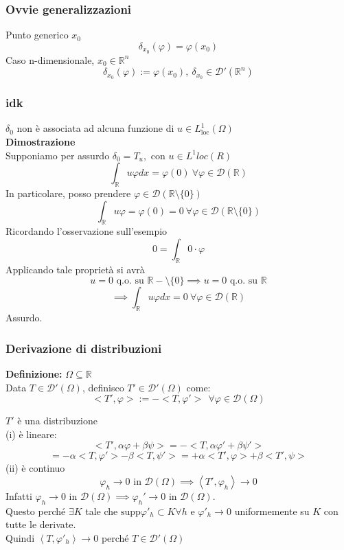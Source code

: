 \documentclass[a4paper]{article}
\newcommand{\R}{\mathbb{R}}
\begin{document}
\subsubsection{Ovvie generalizzazioni}
Punto generico $x_0$
\[\delta_{x_0}(\varphi)=\varphi(x_0)\]
Caso n-dimensionale, $x_0\in \R^n$
\[\delta_{x_0}(\varphi):=\varphi(x_0),\ \delta_{x_0}\in \mathcal D'(\R^n)\]
\subsubsection{idk}
$\delta_0$ non è associata ad alcuna funzione di $u\in L^1_{\text{loc}}(\Omega)$
\\\textbf{Dimostrazione} 
\\Supponiamo per assurdo $\delta_0=T_u,$ con $u\in L^1loc(R)$
\[\int_{\R}^{} u\varphi dx=\varphi(0)\ \forall \varphi \in \mathcal D(\R)\]
In particolare, posso prendere $\varphi \in \mathcal D(\R \setminus \{0\} )$ 
\[\int_{\R}^{} u\varphi=\varphi(0)=0\ \forall \varphi\in\mathcal D(\R\setminus \{ 0\} )\]
Ricordando l'osservazione sull'esempio 
\[0=\int_{\R}^{} 0\cdot \varphi\]
Applicando tale proprietà si avrà
\[u=0\text{ q.o. su }\R-\setminus \{ 0\} \implies u=0\text{ q.o. su }\R\]
\[\implies \int_{\R}^{} u\varphi dx=0\ \forall \varphi \in \mathcal D(\R)\]
Assurdo.
\subsubsection{Derivazione di distribuzioni}
\begin{tcolorbox}
\textbf{Definizione: }$\Omega \subseteq  \R$
\\Data $T\in \mathcal D'(\Omega)$, definisco $T' \in \mathcal D'(\Omega)$ come:
\[<T', \varphi>:=- <T,\varphi'>\ \ \forall \varphi \in \mathcal D(\Omega)\]

\end{tcolorbox}
$T'$ è una distribuzione
\\(i) è lineare:
\[<T',\alpha\varphi +\beta\psi> = -<T,\alpha \varphi'+\beta\psi '>\] \[= -\alpha <T,\varphi'>-\beta<T,\psi'> = +\alpha <T',\varphi>+\beta<T',\psi>\]
(ii) è continuo
\[\varphi_h\to 0\text{ in }\mathcal D(\Omega)\implies \left<T',\varphi_h \right>\to 0\]
Infatti $\varphi_h\to 0\text{ in }\mathcal D(\Omega)\implies\varphi_h'\to 0\text{ in }\mathcal D(\Omega)$.
\\Questo perché $\exists K$ tale che $\text{supp}\varphi'_h\subset K\forall h$ e $\varphi'_h\to 0$ uniformemente su $K$ con tutte le derivate.
\\Quindi $\left<T,\varphi'_h \right>\to 0$ perché $T\in \mathcal D'(\Omega)$
\end{document}
